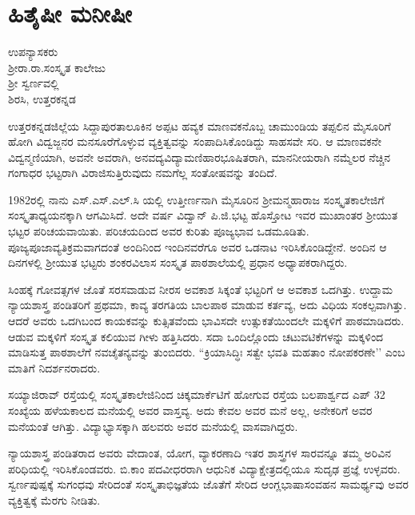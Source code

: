 {\fontsize{14}{16}\selectfont
\chapter{ಹಿತೈಷೀ  \enginline{-}  ಮನೀಷೀ}

\begin{center}
\smallskip

ಉಪನ್ಯಾಸಕರು\\ 
ಶ್ರೀರಾ.ರಾ.ಸಂಸ್ಕೃತ ಕಾಲೇಜು\\
ಶ್ರೀ ಸ್ವರ್ಣವಲ್ಲಿ\\
ಶಿರಸಿ, ಉತ್ತರಕನ್ನಡ
\addrule
\end{center}

ಉತ್ತರಕನ್ನಡಜಿಲ್ಲೆಯ ಸಿದ್ದಾಪುರತಾಲೂಕಿನ ಅಪ್ಪಟ ಹವ್ಯಕ ಮಾಣವಕನೊಬ್ಬ ಚಾಮುಂಡಿಯ ತಪ್ಪಲಿನ ಮೈಸೂರಿಗೆ ಹೋಗಿ ವಿದ್ವಜ್ಜನರ ಮನಸೂರೆಗೊಳ್ಳುವ ವ್ಯಕ್ತಿತ್ವ\-ವನ್ನು ಸಂಪಾದಿಸಿಕೊಂಡಿದ್ದು ಸಾಹಸವೇ ಸರಿ. ಆ ಮಾಣವಕನೇ ವಿದ್ವನ್ಮಣಿಯಾಗಿ, ಅವನೇ ಅವರಾಗಿ, ಅನವದ್ಯವಿದ್ಯಾಮಣಿಹಾರಭೂಷಿತರಾಗಿ, ಮಾನನೀಯರಾಗಿ ನಮ್ಮೆಲರ ನೆಚ್ಚಿನ ಗಂಗಾಧರ ಭಟ್ಟರಾಗಿ ವಿರಾಜಿಸುತ್ತಿರುವುದು ನಮಗೆಲ್ಲ ಸಂತೋಷವನ್ನು ತಂದಿದೆ.

1982ರಲ್ಲಿ ನಾನು  ಎಸ್.ಎಸ್.ಎಲ್.ಸಿ ಯಲ್ಲಿ ಉತ್ತೀರ್ಣನಾಗಿ ಮೈಸೂರಿನ ಶ್ರೀಮನ್ಮಹಾ\-ರಾಜ ಸಂಸ್ಕೃತಕಾಲೇಜಿಗೆ ಸಂಸ್ಕೃತಾಧ್ಯಯನಕ್ಕಾಗಿ ಆಗಮಿಸಿದೆ. ಅದೇ ವರ್ಷ ವಿದ್ವಾನ್ ಪಿ.ಜಿ.ಭಟ್ಟ ಹೊಸ್ತೋಟ ಇವರ ಮುಖಾಂತರ ಶ್ರೀಯುತ ಭಟ್ಟರ ಪರಿ\-ಚಯ\-ವಾಯಿತು. ಪರಿಚಯದಿಂದ ಅವರ ಕುರಿತು ಪೂಜ್ಯಭಾವ ಒಡಮೂಡಿತು. ಪೂಜ್ಯಪೂಜಾವ್ಯತಿಕ್ರಮವಾಗದಂತೆ ಅಂದಿನಿಂದ ಇಂದಿನವರೆಗೂ ಅವರ ಒಡನಾಟ ಇರಿಸಿ\-ಕೊಂಡಿದ್ದೇನೆ. ಅಂದಿನ ಆ ದಿನಗಳಲ್ಲಿ ಶ್ರೀಯುತ ಭಟ್ಟರು ಶಂಕರವಿಲಾಸ ಸಂಸ್ಕೃತ ಪಾಠಶಾಲೆಯಲ್ಲಿ ಪ್ರಧಾನ ಅಧ್ಯಾಪಕರಾಗಿದ್ದರು.

ಸಿಂಹಕ್ಕೆ ಗೋವತ್ಸಗಳ ಜೊತೆ ಸರಸವಾಡುವ ನೀರಸ ಅವಕಾಶ ಸಿಕ್ಕಂತೆ ಭಟ್ಟರಿಗೆ ಆ ಅವಕಾಶ ಒದಗಿತ್ತು. ಉದ್ದಾಮ ನ್ಯಾಯಶಾಸ್ತ್ರ ಪಂಡಿತರಿಗೆ ಪ್ರಥಮಾ, ಕಾವ್ಯ ತರಗತಿಯ ಬಾಲಪಾಠ ಮಾಡುವ ಕರ್ತವ್ಯ, ಅದು ವಿಧಿಯ ಸಂಕಲ್ಪವಾಗಿತ್ತು.  ಆದರೆ ಅವರು ಒದಗಿ\-ಬಂದ ಕಾಯಕವನ್ನು ಕುತ್ಸಿತವೆಂದು ಭಾವಿಸದೇ  ಉತ್ಸುಕತೆಯಿಂದಲೇ ಮಕ್ಕಳಿಗೆ ಪಾಠಮಾಡಿದರು. ಆಡುವ ಮಕ್ಕಳಿಗೆ ಸಂಸ್ಕೃತ ಕಲಿಯುವ ಗೀಳು ಹತ್ತಿಸಿದರು. ಸದಾ ಒಂದಿಲ್ಲೊಂದು ಚಟುವಟಿಕೆಗಳನ್ನು ಮಕ್ಕಳಿಂದ ಮಾಡಿಸುತ್ತ ಪಾಠಶಾಲೆಗೆ ನವಚೈತನ್ಯವನ್ನು ತುಂಬಿದರು. “ಕ್ರಿಯಾಸಿದ್ಧಿಃ ಸತ್ವೇ ಭವತಿ ಮಹತಾಂ ನೋಪಕರಣೇ’’ ಎಂಬ ಮಾತಿಗೆ ನಿದರ್ಶನರಾದರು.
\vskip 2pt

ಸಯ್ಯಾಜಿರಾವ್ ರಸ್ತೆಯಲ್ಲಿ ಸಂಸ್ಕೃತಕಾಲೇಜಿನಿಂದ ಚಿಕ್ಕಮಾರ್ಕೆಟಿಗೆ ಹೋಗುವ ರಸ್ತೆಯ ಬಲಪಾರ್ಶ್ವದ   \enginline{-}   ಎಪ್   \enginline{-}   32 ಸಂಖ್ಯೆಯ ಹಳೆಯಕಾಲದ ಮನೆಯಲ್ಲಿ ಅವರ ವಾಸ್ತವ್ಯ. ಅದು ಕೇವಲ ಅವರ ಮನೆ ಅಲ್ಲ, ಅನೇಕರಿಗೆ ಅವರ ಮನೆಯಂತೆ ಆಗಿತ್ತು. ವಿದ್ಯಾಭ್ಯಾಸಕ್ಕಾಗಿ ಹಲವರು ಅವರ ಮನೆಯಲ್ಲಿ ವಾಸವಾಗಿದ್ದರು.
\vskip 2pt

ನ್ಯಾಯಶಾಸ್ತ್ರ ಪಂಡಿತರಾದ ಅವರು ವೇದಾಂತ, ಯೋಗ, ವ್ಯಾಕರಣಾದಿ ಇತರ ಶಾಸ್ತ್ರಗಳ ಸಾರವನ್ನೂ ತಮ್ಮ ಅರಿವಿನ ಪರಿಧಿಯಲ್ಲಿ ಇರಿಸಿಕೊಂಡವರು. ಬಿ.ಕಾಂ ಪದವೀ\-ಧರರಾಗಿ ಆಧುನಿಕ ವಿದ್ಯಾಕ್ಷೇತ್ರದಲ್ಲಿಯೂ ಸುದೃಢ ಪ್ರಜ್ಞೆ ಉಳ್ಳವರು. ಸ್ವರ್ಣಪುಷ್ಪಕ್ಕೆ ಸುಗಂಧವು ಸೇರಿದಂತೆ ಸಂಸ್ಕೃತಾಭಿಜ್ಞತೆಯ ಜೊತೆಗೆ ಸೇರಿದ ಆಂಗ್ಲಭಾಷಾಸಂವಹನ ಸಾಮರ್ಥ್ಯವು ಅವರ ವ್ಯಕ್ತಿತ್ವಕ್ಕೆ ಮೆರಗು ನೀಡಿತು. 
\vskip 2pt

}
